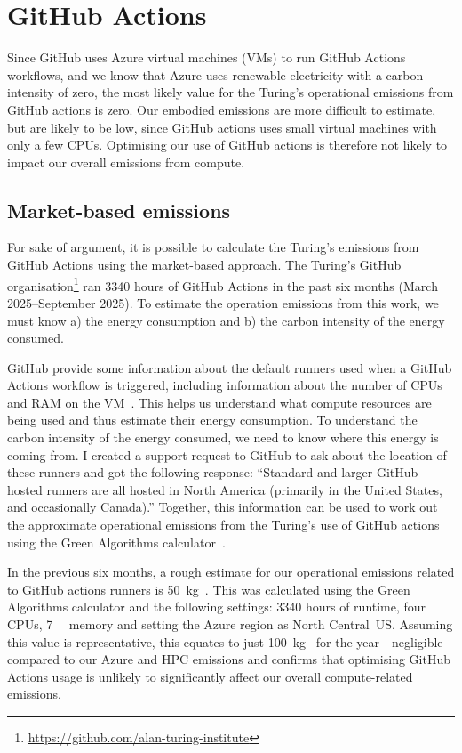 \documentclass[12pt]{article}
\newcommand{\cooe}{\ensuremath{\mathrm{CO}_2\mathrm{e}}}
\begin{document}
\section{GitHub Actions}
\label{sec:github}

Since GitHub uses Azure virtual machines (VMs) to run GitHub Actions workflows, and we know that Azure uses renewable electricity with a carbon intensity of zero, the most likely value for the Turing's operational emissions from GitHub actions is zero. Our embodied emissions are more difficult to estimate, but are likely to be low, since GitHub actions uses small virtual machines with only a few CPUs. Optimising our use of GitHub actions is therefore not likely to impact our overall emissions from compute.

\subsection{Market-based emissions}

For sake of argument, it is possible to calculate the Turing's emissions from GitHub Actions using the market-based approach. The Turing's GitHub organisation\footnote{\url{https://github.com/alan-turing-institute}} ran \num{3340} hours of GitHub Actions in the past six months (March 2025--September 2025). To estimate the operation emissions from this work, we must know a) the energy consumption and b) the carbon intensity of the energy consumed.

GitHub provide some information about the default runners used when a
GitHub Actions workflow is triggered, including information about the
number of CPUs and RAM on the VM~\cite{github_runners_info}. This helps
us understand what compute resources are being used and thus estimate
their energy consumption.  To understand the carbon intensity of the energy consumed,
we need to know where this energy is coming from. I created a support
request to GitHub to ask about the location of these runners and got the
following response: ``Standard and larger GitHub-hosted runners are all
hosted in North America (primarily in the United States, and
occasionally Canada).'' Together, this information can be used to work
out the approximate operational emissions from the Turing's use of
GitHub actions using the Green Algorithms
calculator~\cite{green_algorithms}.

In the previous six months, a rough estimate for our operational emissions related to GitHub actions runners is \qty[qualifier-mode=combine]{50}{\kilogram\of{\cooe}}.
This was calculated using the Green Algorithms calculator and the following settings: \num{3340} hours of runtime, four CPUs, \qty{7}{\giga\byte} memory and setting the Azure region as North Central~US.
Assuming this value is representative, this equates to just \qty[qualifier-mode=combine]{100}{\kilogram\of{\cooe}} for the year - negligible compared to our Azure and HPC emissions and confirms that optimising GitHub Actions usage is unlikely to significantly affect our overall compute-related emissions.
\end{document}
